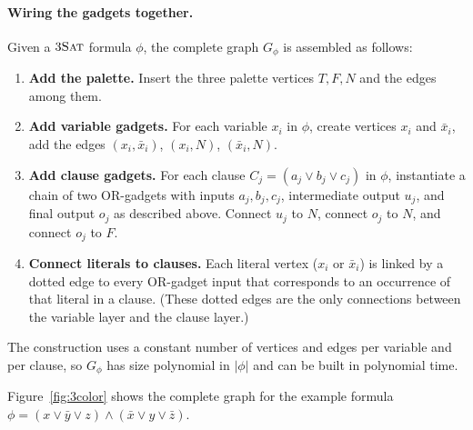 \documentclass[manuscript,nonacm]{acmart}
\theoremstyle{definition}
\begin{document}
\paragraph{Wiring the gadgets together.}
Given a $3\textsc{Sat}$ formula $\phi$, the complete graph $G_\phi$ is assembled as
follows:
\begin{enumerate}
  \item \textbf{Add the palette.}  Insert the three palette vertices $T,F,N$ and
the edges among them.
  \item \textbf{Add variable gadgets.}  For each variable $x_i$ in $\phi$, create
vertices $x_i$ and $\bar x_i$, add the edges
$(x_i,\bar x_i)$, $(x_i,N)$, $(\bar x_i,N)$.
  \item \textbf{Add clause gadgets.}  For each clause $C_j=(a_j\vee b_j\vee c_j)$
in $\phi$, instantiate a chain of two OR-gadgets with inputs $a_j,b_j,c_j$,
intermediate output $u_j$, and final output $o_j$ as described above.  Connect
$u_j$ to $N$, connect $o_j$ to $N$, and connect $o_j$ to $F$.
  \item \textbf{Connect literals to clauses.}  Each literal vertex ($x_i$ or
$\bar x_i$) is linked by a dotted edge to every OR-gadget input that
corresponds to an occurrence of that literal in a clause.  (These dotted edges
are the only connections between the variable layer and the clause layer.)
\end{enumerate}
The construction uses a constant number of vertices and edges per variable and
per clause, so $G_\phi$ has size polynomial in $|\phi|$ and can be built in
polynomial time.

Figure~\ref{fig:3color} shows the complete graph for the example formula
$\phi=(x\vee\bar y\vee z)\wedge(\bar x\vee y\vee\bar z)$.
\end{document}
